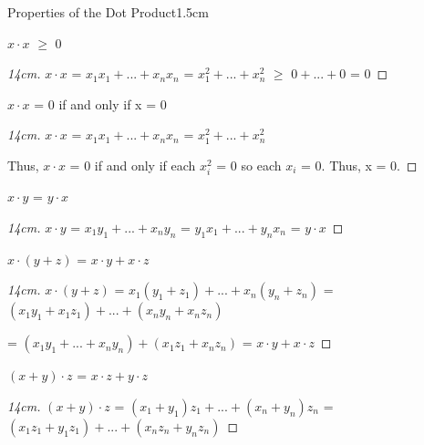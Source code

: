     \begin{ltheorem}{Properties of the Dot Product}{1.5cm}
        \item $x \cdot x$ $\geq$ 0
        
            \begin{proof}[14cm]
                $x \cdot x$
                = $x_1x_1 + ... + x_nx_n$
                = $x_1^2 + ... + x_n^2$
                $\geq$ $0 + ... + 0$
                = 0
            \end{proof}

        \item $x \cdot x$ = 0 if and only if x = 0 
        
            \begin{proof}[14cm]
                $x \cdot x$
                = $x_1x_1 + ... + x_nx_n$
                = $x_1^2 + ... + x_n^2$
                
                Thus, $x \cdot x$ = 0
                if and only if each $x_i^2$ = 0
                so each $x_i$ = 0.
                Thus, x = 0.
            \end{proof}

        \item $x \cdot y$ = $y \cdot x$
            
            \begin{proof}[14cm]
                $x \cdot y$
                = $x_1y_1 + ... + x_ny_n$
                = $y_1x_1 + ... + y_nx_n$
                = $y \cdot x$
            \end{proof}

        \item $x \cdot (y+z)$ = $x \cdot y + x \cdot z$
        
            \begin{proof}[14cm]
                $x \cdot (y+z)$
                = $x_1(y_1+z_1) + ... + x_n(y_n+z_n)$
                = $(x_1y_1+x_1z_1) + ... + (x_ny_n+x_nz_n)$

                \hspace{1.6cm}
                = $(x_1y_1+...+x_ny_n) + (x_1z_1+x_nz_n)$
                = $x \cdot y + x \cdot z$
            \end{proof}

        \item $(x+y) \cdot z$ = $x \cdot z + y \cdot z$
            
            \begin{proof}[14cm]
                $(x+y) \cdot z$
                = $(x_1+y_1)z_1 + ... + (x_n+y_n)z_n$
                = $(x_1z_1+y_1z_1) + ... + (x_nz_n+y_nz_n)$


\end{proof}
\end{ltheorem}
